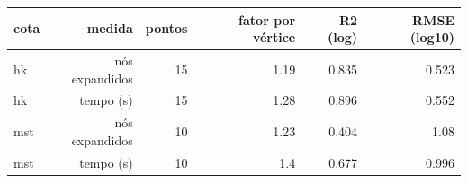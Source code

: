 \begin{tabular}{lrrrrr}
\hline
cota & medida & pontos & fator por vértice & R2 (log) & RMSE (log10) \\
\hline
hk & nós expandidos & 15 & 1.19 & 0.835 & 0.523 \\
hk & tempo (s) & 15 & 1.28 & 0.896 & 0.552 \\
mst & nós expandidos & 10 & 1.23 & 0.404 & 1.08 \\
mst & tempo (s) & 10 & 1.4 & 0.677 & 0.996 \\
\hline
\end{tabular}

